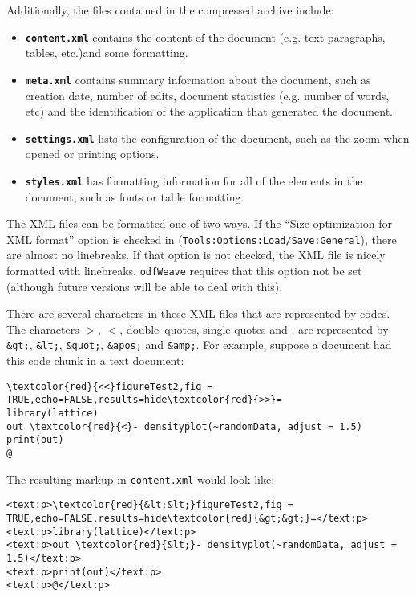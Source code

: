\documentclass[12pt]{article}
\newcommand{\odfWeave}{{\tt odfWeave}\xspace}
\begin{document}
Additionally, the files contained in the compressed archive include:
\begin{itemize}
\item {\bf \tt content.xml} contains the content of the document (e.g. text paragraphs, tables, etc.)and some formatting.
\item {\bf \tt meta.xml} contains summary information about the document, such as creation date, number of edits, document statistics (e.g. number of words, etc) and the identification of the application that generated the document.
\item {\bf \tt settings.xml} lists the configuration of the document, such as the zoom when opened or printing options.
\item {\bf \tt styles.xml} has formatting information for all of the elements in the document, such as fonts or table formatting.
\end{itemize}
The XML files can be formatted one of two ways. If the ``Size optimization for XML format'' option is checked in (\texttt{Tools:Options:Load/Save:General}), there are almost no linebreaks. If that option is not checked, the XML file is nicely formatted with linebreaks. \odfWeave  requires that this option not be set (although future versions will be able to deal with this).

There are several characters in these XML files that are represented by codes. The characters $>$, $<$, double--quotes, single-quotes and \@, are represented by \texttt{\&gt;}, \texttt{\&lt;}, \texttt{\&quot;}, \texttt{\&apos;} and \texttt{\&amp;}. For example, suppose a document had this code chunk in a text document:
\begin{Verbatim}[fontsize=\footnotesize, frame=single, framesep=5mm, rulecolor=\color{blue}, samepage = true, commandchars=\\\{\}]
\textcolor{red}{<<}figureTest2,fig = TRUE,echo=FALSE,results=hide\textcolor{red}{>>}=
library(lattice)
out \textcolor{red}{<}- densityplot(~randomData, adjust = 1.5)
print(out)
@
\end{Verbatim}
The resulting markup in \texttt{content.xml} would look like:
\begin{Verbatim}[fontsize=\footnotesize, frame=single, framesep=5mm, rulecolor=\color{blue}, samepage = true, commandchars=\\\{\}]
<text:p>\textcolor{red}{&lt;&lt;}figureTest2,fig = TRUE,echo=FALSE,results=hide\textcolor{red}{&gt;&gt;}=</text:p>
<text:p>library(lattice)</text:p>
<text:p>out \textcolor{red}{&lt;}- densityplot(~randomData, adjust = 1.5)</text:p>
<text:p>print(out)</text:p>
<text:p>@</text:p>
\end{Verbatim}
\end{document}
